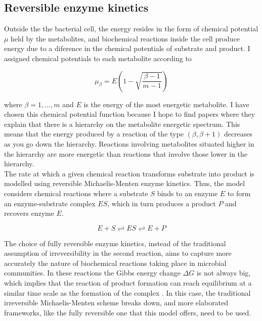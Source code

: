 \documentclass[titlepage,11pt]{article}
\begin{document}
\begin{linenumbers}
\begin{singlespace}
\subsection{Reversible enzyme kinetics}\label{subsed:reversible_enzyme_kinetics}
Outside the the bacterial cell, the energy resides in the form of chemical potential $ \mu $ held by the metabolites, and biochemical reactions inside the cell produce energy due to a diference in the chemical potentials of substrate and product. I assigned chemical potentials to each metabolite according to
\begin{linenomath*}	
	\begin{equation}
	\mu_{\beta} = E \left(1 - \sqrt{\frac{\beta-1}{m-1}}\right)
	\end{equation}
\end{linenomath*}	
where $ \beta = 1, \dots, m $ and $ E $ is the energy of the most energetic metabolite.
I have chosen this chemical potential function because I hope to find papers where they explain that there is a hierarchy on the metabolite energetic spectrum. This means that the energy produced by a reaction of the type $ (\beta, \beta+1) $ decreases as you go down the hierarchy. Reactions involving metabolites situated higher in the hierarchy are more energetic than reactions that involve those lower in the hierarchy.\\
The rate at which a given chemical reaction transforms substrate into product is modelled using reversible Michaelis-Menten enzyme kinetics. Thus, the model considers chemical reactions where a substrate $ S $ binds to an enzyme $ E $ to form an enzyme-substrate complex $ ES $, which in turn produces a product $ P $ and recovers enzyme $ E $. 
\begin{linenomath*}	
	\begin{equation}\label{eq:react_shceme}
	E + S \rightleftharpoons ES \rightleftharpoons E + P
	\end{equation}	
\end{linenomath*}
The choice of fully reversible enzyme kinetics, instead of the traditional assumption of irreversibility in the second reaction, aims to capture more accurately the nature of biochemical reactions taking place in microbial communities. In these reactions the Gibbs energy change $ \Delta G $ is not always big, which implies that the reaction of product formation can reach equilibrium at a similar time scale as the formation of the complex \citep{Keener2008}. In this case, the traditional irreversible Michaelis-Menten scheme breaks down, and more elaborated frameworks, like the fully reversible one that this model offers, need to be used.\\

\end{singlespace}
\end{linenumbers}
\end{document}
